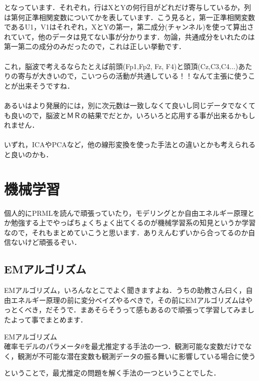 \documentclass[11pt,a4paper,dvipdfmx]{ujreport}
\begin{document}
となっています．それぞれ，行はXとYの何行目がどれだけ寄与しているか，列は第何正準相関変数についてかを表しています．こう見ると，第一正準相関変数であるU1，V1はそれぞれ，XとYの第一，第二成分(チャンネル)を使って算出されていて，他のデータは見てない事が分かります．勿論，共通成分をいれたのは第一第二の成分のみだったので，これは正しい挙動です．\\
\\

これ，脳波で考えるならたとえば前頭(Fp1,Fp2, Fz, F4)と頭頂(Cz,C3,C4...)あたりの寄与が大きいので，こいつらの活動が共通している！！なんて主張に使うことが出来そうですね．\\\\

あるいはより発展的には，別に次元数は一致しなくて良いし同じデータでなくても良いので，脳波とＭＲの結果でだとか，いろいろと応用する事が出来るかもしれません．\\\\

いずれ，ICAやPCAなど，他の線形変換を使った手法との違いとかも考えられると良いのかも．


\chapter{機械学習}
個人的にPRMLを読んで頑張っていたり，モデリングとか自由エネルギー原理とか勉強する上でやっぱちょくちょく出てくるのが機械学習系の知見というか学習なので，それもまとめていこうと思います．ありえんむずいから合ってるのか自信ないけど頑張るぞい．

\section{EMアルゴリズム}
EMアルゴリズム，いろんなとこでよく聞きますよね．うちの助教さん曰く，自由エネルギー原理の前に変分ベイズやるべきで，その前にEMアルゴリズムはやっとくべき，だそうで．まあそらそうって感もあるので頑張って学習してみましたよって事でまとめます．\\

\begin{screen}
  EMアルゴリズム\\
  確率モデルのパラメータ$\theta$を最尤推定する手法の一つ．観測可能な変数だけでなく，観測が不可能な潜在変数も観測データの振る舞いに影響している場合に使う
\end{screen}

ということで，最尤推定の問題を解く手法の一つということでした．\\
\end{document}
